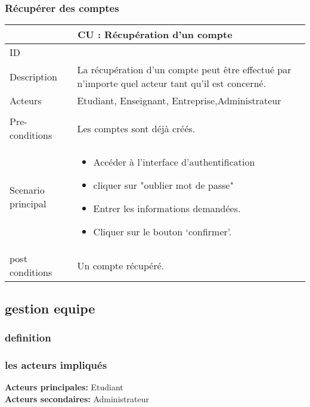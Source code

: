 \documentclass[11pt,fleqn]{book} %
\begin{document}
\subsubsection{Récupérer des comptes}
\begin{center}
\begin{tabularx}{1\textwidth} { | p{4cm} | >{\raggedright\arraybackslash}X |  }
  \hline
  \multicolumn{2}{|c|}{CU : Récupération d’un compte} \\
 \hline
 ID & 4  \\
 \hline
 Description  &  La récupération d’un compte peut être effectué par n’importe quel acteur tant qu’il est concerné.   \\
  \hline
 Acteurs  & Etudiant, Enseignant, Entreprise,Administrateur   \\
  \hline   \\
 Pre-conditions  & Les comptes sont déjà créés.  \\
  \hline
 Scenario principal  & 
 \begin{itemize}
     \item Accéder à l'interface d’authentification 
     \item cliquer sur "oublier mot de passe"
     \item Entrer les informations demandées.
     \item Cliquer sur le bouton ‘confirmer’.

 \end{itemize}\\
  \hline
 post conditions  &  Un compte récupéré.  \\
  \hline
\end{tabularx}
\label{tbl:nicetablelesstable}
\end{center}
\subsection{gestion equipe}

\subsubsection{definition}

\subsubsection{les acteurs impliqués}
\textbf{Acteurs principales: }Etudiant \\
\textbf{Acteurs secondaires: }Administrateur
\end{document}
